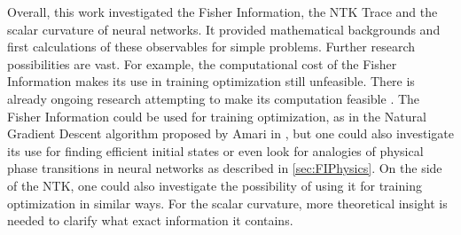 Overall, this work investigated the Fisher Information, the NTK Trace and the scalar curvature of neural networks. It provided mathematical backgrounds and first calculations of these observables for simple problems. Further research possibilities are vast. For example, the computational cost of the Fisher Information makes its use in training optimization still unfeasible. There is already ongoing research attempting to make its computation feasible \cite{EfficientFisherResearch}. The Fisher Information could be used for training optimization, as in the Natural Gradient Descent algorithm proposed by Amari in \cite{NGDWorksEfficiently}, but one could also investigate its use for finding efficient initial states or even look for analogies of physical phase transitions in neural networks as described in \cref{sec:FIPhysics}. On the side of the NTK, one could also investigate the possibility of using it for training optimization in similar ways. For the scalar curvature, more theoretical insight is needed to clarify what exact information it contains. 

